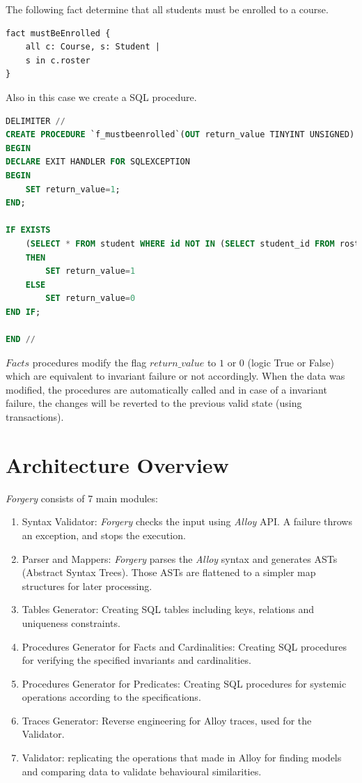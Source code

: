 \documentclass[oneside]{book}
\begin{document}
The following fact determine that all students must be enrolled to a course.
\begin{lstlisting}
fact mustBeEnrolled {
	all c: Course, s: Student | 
	s in c.roster
}
\end{lstlisting}

Also in this case we create a SQL procedure.

\begin{lstlisting}[escapechar=@,language=SQL]
DELIMITER //
CREATE PROCEDURE `f_mustbeenrolled`(OUT return_value TINYINT UNSIGNED)
BEGIN
DECLARE EXIT HANDLER FOR SQLEXCEPTION
BEGIN
	SET return_value=1;
END;

IF EXISTS
	(SELECT * FROM student WHERE id NOT IN (SELECT student_id FROM roster))
	THEN
		SET return_value=1
	ELSE
		SET return_value=0
END IF;
	
END //
\end{lstlisting}

$Facts$ procedures modify the flag $return\_value$ to $1$ or $0$ (logic True or False) which are equivalent to invariant failure or not accordingly. When the data was modified, the procedures are automatically called and in case of a invariant failure, the changes will be reverted to the previous valid state (using transactions).\\

\newpage

\section{Architecture Overview}

\textit{Forgery} consists of 7 main modules:
\begin{enumerate}
	\item Syntax Validator: \textit{Forgery} checks the input using \textit{Alloy} API. A failure throws an exception, and stops the execution.
	\item Parser and Mappers: \textit{Forgery} parses the \textit{Alloy} syntax and generates ASTs (Abstract Syntax Trees). Those ASTs are flattened to a simpler map structures for later processing.
	\item Tables Generator: Creating SQL tables including keys, relations and uniqueness constraints.
	\item Procedures Generator for Facts and Cardinalities: Creating SQL procedures for verifying the specified invariants and cardinalities. 
	\item Procedures Generator for Predicates: Creating SQL procedures for systemic operations according to the specifications.
	\item Traces Generator: Reverse engineering for Alloy traces, used for the Validator.
	\item Validator: replicating the operations that made in Alloy for finding models and comparing data to validate behavioural similarities.
\end{enumerate}
\end{document}
